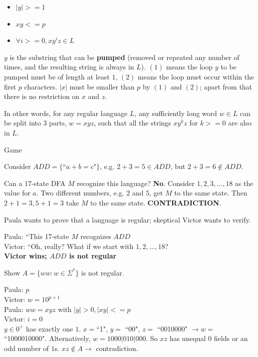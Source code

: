 \documentclass[8pt,landscape,legalpaper]{article}
\makeatletter
\renewcommand{\subsubsection}{\@startsection{subsubsection}{3}{0mm}
                                {-1ex plus -.5ex minus -.2ex}
                                {1ex plus .2ex}
                                {\normalfont\small\bfseries}}
\makeatother
\begin{document}
\begin{multicols}{6}
\begin{itemize}
    \item $|y| >= 1$
    \item $xy <= p$
    \item $\forall i >= 0, xy^iz \in L$
\end{itemize}

$y$ is the substring that can be {\bf pumped} (removed or repeated any number of times, and the resulting string is always in $L$). $(1)$ means the loop $y$ to be pumped must be of length at least $1$, $(2)$ means the loop must occur within the first $p$ characters. $|x|$ must be smaller than $p$ by $(1)$ and $(2)$; apart from that there is no restriction on $x$ and $z$.

In other words, for any regular language $L$, any sufficiently long word $w \in L$ can be split into $3$ parts, $w = xyz$, such that all the strings $xy^kz$ for $k >= 0$ are also in $L$.

\subsubsection{Game}

Consider $ADD = \{$``$a + b = c$"$\}$, e.g. $2 + 3 = 5 \in ADD$, but $2 + 3 = 6 \notin ADD$.

Can a $17$-state DFA $M$ recognize this language? {\bf No}. Consider $1, 2, 3, ..., 18$ as the value for $a$. Two different numbers, e.g. $2$ and $5$, get $M$ to the same state. Then $2 + 1 = 3, 5 + 1 = 3$ take $M$ to the same state. {\bf CONTRADICTION}.

Paula wants to prove that a language is regular; skeptical Victor wants to verify.

Paula: ``This 17-state $M$ recognizes $ADD$\\
Victor: ``Oh, really? What if we start with $1, 2, ..., 18$?\\
{\bf Victor wins; $ADD$ is not regular}

\hline

Show $A = \{ww: w \in \Sigma^*\}$ is not regular.

Paula: $p$\\
Victor: $w = 10^{p+1}$\\
Paula: $ww = xyz$ with $|y| > 0, |xy| <= p$\\
Victor: $i = 0$\\
$y \in 0^+$ has exactly one $1$. $x = $``1", $y =$ ``00", $z =$ ``0010000" $\rightarrow w =$ ``1000010000". Alternatively, $w = 1000|010|000$. So $xz$ has unequal $0$ fields or an odd number of $1$s. $xz \notin A \rightarrow$ contradiction.


\end{multicols}
\end{document}
